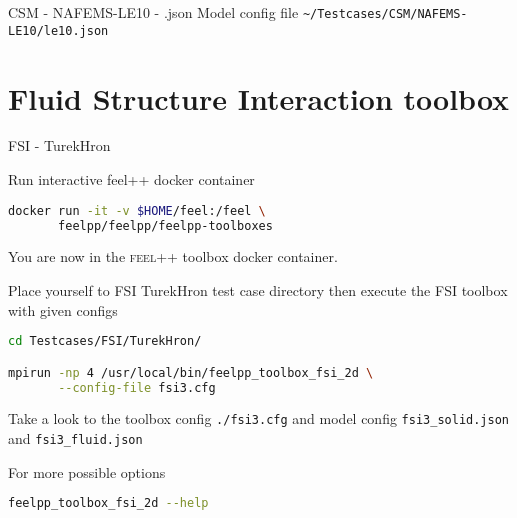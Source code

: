 \begin{frame}{CSM - NAFEMS-LE10 - .json}
Model config file \lstinline{~/Testcases/CSM/NAFEMS-LE10/le10.json}

\framebreak
\end{frame}


















\section[FSI]{Fluid Structure Interaction toolbox}




\begin{frame}{FSI - TurekHron}

Run  interactive feel++ docker container

\begin{lstlisting}[language=Bash,mathescape=false,emph={docker}]
docker run -it -v $HOME/feel:/feel \
       feelpp/feelpp/feelpp-toolboxes 
\end{lstlisting}

You are now in the \textsc{feel++} toolbox docker container.

Place yourself to FSI TurekHron test case directory then execute the
FSI toolbox with given configs

\begin{lstlisting}[language=Bash,mathescape=false, emph={feelpp_toolbox_fsi_2d}]
cd Testcases/FSI/TurekHron/

mpirun -np 4 /usr/local/bin/feelpp_toolbox_fsi_2d \
       --config-file fsi3.cfg
\end{lstlisting}

Take a look to the toolbox config \lstinline{./fsi3.cfg} and model config
\lstinline{fsi3_solid.json} and \lstinline{fsi3_fluid.json}

For more possible options
\begin{lstlisting}[language=Bash,mathescape=false, emph={feelpp_toolbox_fsi_2d}]
feelpp_toolbox_fsi_2d --help
\end{lstlisting}

\end{frame}



